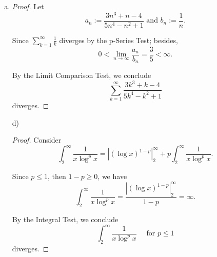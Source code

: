 \begin{Exercise}
\begin{enumerate}[a)]
\item 
\begin{proof}
Let 
$$
a_n := \frac{3n^3+n-4}{5n^4-n^2+1}\text{ and } b_n :=\frac{1}{n}.
$$

Since $\sum_{k=1}^{\infty}\frac{1}{k}$ diverges by the p-Series Test; besides,
$$
0
< \lim_{n\to\infty}\frac{a_n}{b_n} 
= \frac{3}{5} 
< \infty.
$$

By the Limit Comparison Test, we conclude 
$$
\sum_{k=1}^{\infty}\frac{3k^3+k-4}{5k^4-k^2+1}
$$ 
diverges.
\end{proof}

\item [d)]
\begin{proof}
Consider 
$$
\int_{2}^{\infty}\frac{1}{x\log^p{x}} 
= \left|(\log{x})^{1-p}\right|_{2}^{\infty} + p\int_{2}^{\infty}\frac{1}{x\log^p{x}}.
$$

Since $p \leq 1$, then $1-p \geq 0$, we have 
$$
\int_{2}^{\infty}\frac{1}{x\log^p{x}} 
= \frac{\left|(\log{x})^{1-p}\right|_{2}^{\infty}}{1-p} 
= \infty.
$$

By the Integral Test, we conclude 
$$
\int_{2}^{\infty}\frac{1}{x\log^p{x}}\quad\mbox{ for }p \leq 1
$$
diverges.
\end{proof}
\end{enumerate}
\end{Exercise}